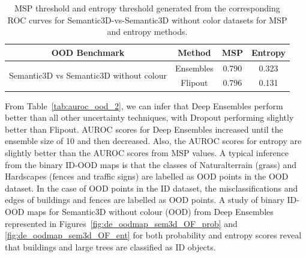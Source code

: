     \begin{table}[h!]
        \centering
        \begin{tabular}{cccc}
            \hline
            OOD Benchmark                                           & Method    & MSP   & Entropy \\ \hline
           \multirow{2}{*}{Semantic3D vs Semantic3D without colour} & Ensembles & 0.790 & 0.323   \\ 
                                                                   & Flipout   & 0.796 & 0.131   \\ \hline
        \end{tabular}
        \caption{MSP threshold and entropy threshold generated from the corresponding ROC curves for Semantic3D-vs-Semantic3D without color datasets for MSP and entropy methods.}
        \label{tab:thresholds_2}
    \end{table}
    From Table~\ref{tab:auroc_ood_2}, we can infer that Deep Ensembles perform better than all other uncertainty techniques, with Dropout performing slightly better than Flipout.
    AUROC scores for Deep Ensembles increased until the ensemble size of 10 and then decreased.
    Also, the AUROC scores for entropy are slightly better than the AUROC scores from MSP values.
    A typical inference from the binary ID-OOD maps is that the classes of Naturalterrain (grass) and Hardscapes (fences and traffic signs) are labelled as OOD points in the OOD dataset.
    In the case of OOD points in the ID dataset, the misclassifications and edges of buildings and fences are labelled as OOD points.
    A study of binary ID-OOD maps for Semantic3D without colour (OOD) from Deep Ensembles represented in Figures~\ref{fig:de_oodmap_sem3d_OF_prob} and \ref{fig:de_oodmap_sem3d_OF_ent} for both probability and entropy scores reveal that buildings and large trees are classified as ID objects.
